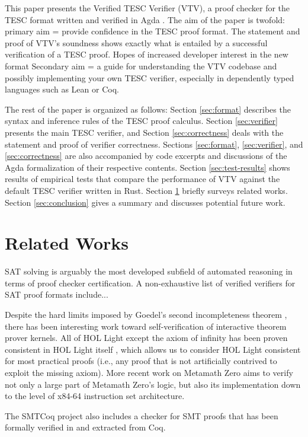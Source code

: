 \documentclass[12pt]{article}
\begin{document}
This paper presents the Verified TESC Verifier (VTV), a proof checker for  
the TESC format written and verified in Agda \cite{}. 
The aim of the paper is twofold:
primary aim = provide confidence in the TESC proof format. The statement and 
proof of VTV's soundness shows exactly what is entailed by a successful
verification of a TESC proof. Hopes of increased developer interest in the new format 
Secondary aim = a guide for understanding the VTV codebase and possibly implementing 
your own TESC verifier, especially in dependently typed languages such as Lean or Coq.

The rest of the paper is organized as follows:
Section \ref{sec:format} describes the syntax and inference rules 
of the TESC proof calculus.
Section \ref{sec:verifier} presents the main TESC verifier, and
Section \ref{sec:correctness} deals with the statement and proof of verifier
correctness. 
Sections \ref{sec:format}, \ref{sec:verifier}, and \ref{sec:correctness} 
are also accompanied by code excerpts and discussions of the Agda 
formalization of their respective contents. 
Section \ref{sec:test-results} shows results of empirical tests that compare 
the performance of VTV against the default TESC verifier written in Rust. 
Section \ref{sec:rel-works} briefly surveys related works. Section 
\ref{sec:conclusion} gives a summary and discusses potential future work.

\section{Related Works} \label{sec:rel-works}

SAT solving is arguably the most developed subfield of automated reasoning
in terms of proof checker certification. A non-exhaustive list of verified 
verifiers for SAT proof formats include... 

Despite the hard limits imposed by Goedel's second incompleteness theorem \cite{},
there has been interesting work toward self-verification of interactive 
theorem prover kernels. All of HOL Light except the axiom of infinity has been 
proven consistent in HOL Light itself \cite{}, which allows us to consider HOL Light
consistent for most practical proofs (i.e., any proof that is not artificially 
contrived to exploit the missing axiom). More recent work on Metamath Zero \cite{}
aims to verify not only a large part of Metamath Zero's logic, but also its 
implementation down to the level of x84-64 instruction set architecture. 

The SMTCoq project \cite{} also includes a checker for SMT proofs that has been 
formally verified in and extracted from Coq.
\end{document}
